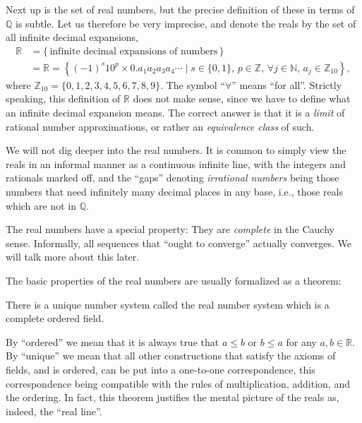 Next up is the set of real numbers, but the precise definition of these in terms of $\mathbb{Q}$ is subtle. Let us therefore be very imprecise, and denote the reals by the set of all infinite decimal expansions, 
\begin{align}
    \mathbb{R} &= \{ \, \text{infinite decimal expansions of numbers} \, \} \\
    &=
    \mathbb{R} = \left\{ (-1)^s 10^{p} \times 0.a_1 a_2 a_3 a_4 \cdots \mid s \in \{0, 1\}, \, p \in \mathbb{Z}, \, \forall j\in\mathbb{N}, \, a_j \in \mathbb{Z}_{10} \right\},
\end{align}
where $\mathbb{Z}_{10} = \{0, 1, 2, 3, 4, 5, 6, 7, 8, 9 \}$. The symbol ``$\forall$'' means ``for all''. Strictly speaking, this definition of $\mathbb{R}$ does not make sense, since we have to define what an infinite decimal expansion means. The correct answer is that it is a \emph{limit} of rational number approximations, or rather an \emph{equivalence class} of such.


We will not dig deeper into the real numbers. It is common to simply view the reals in an informal manner as a continuous infinite line, with the integers and rationals marked off, and the ``gaps'' denoting \emph{irrational numbers} being those numbers that need infinitely many decimal places in any base, i.e., those reals which are not in $\mathbb{Q}$.

The real numbers have a special property: They are \emph{complete} in the Cauchy sense. Informally, all sequences that ``ought to converge'' actually converges. We will talk more about this later.

The basic properties of the real numbers are usually formalized as a theorem:

\begin{myTheorem}{}{} There is a unique number system called the real number system which is a complete ordered field.
\end{myTheorem}
By ``ordered'' we mean that it is always true that $a \leq b$ or $b \leq a$ for any $a,b \in \mathbb{R}$.
By ``unique'' we mean that all other constructions that satisfy the axioms of fields, and is ordered, can be put into a one-to-one correspondence, this correspondence being compatible with the rules of multiplication, addition, and the ordering. In fact, this theorem justifies the mental picture of the reals as, indeed, the ``real line''.






